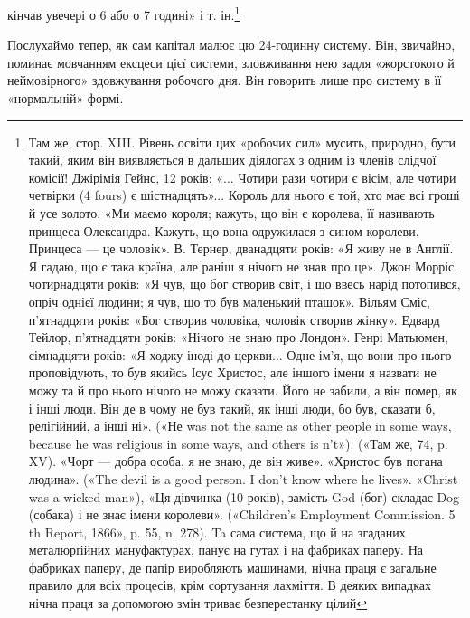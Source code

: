 кінчав увечері о 6 або о 7 годині» і т. ін.\footnote{
Там же, стор. XIII. Рівень освіти цих «робочих сил» мусить, природно,
бути такий, яким він виявляється в дальших діялогах з одним із
членів слідчої комісії! Джірімія Гейнс, 12 років: «... Чотири рази чотири
є вісім, але чотири четвірки (4 fours) є шістнадцять»... Король для
нього є той, хто має всі гроші й усе золото. «Ми маємо короля; кажуть,
що він є королева, її називають принцеса Олександра. Кажуть, що вона
одружилася з сином королеви. Принцеса — це чоловік». В. Тернер,
дванадцяти років: «Я живу не в Англії. Я гадаю, що є така країна, але
раніш я нічого не знав про це». Джон Морріс, чотирнадцяти років: «Я чув,
що бог створив світ, і що ввесь нарід потопився, опріч однієї людини; я
чув, що то був маленький пташок». Вільям Сміс, п’ятнадцяти років:
«Бог створив чоловіка, чоловік створив жінку». Едвард Тейлор, п’ятнадцяти
років: «Нічого не знаю про Лондон». Генрі Матьюмен, сімнадцяти
років: «Я ходжу іноді до церкви... Одне ім’я, що вони про нього проповідують,
то був якийсь Ісус Христос, але іншого імени я назвати не можу
та й про нього нічого не можу сказати. Його не забили, а він помер, як
і інші люди. Він де в чому не був такий, як інші люди, бо був, сказати б,
релігійний, а інші ні». («Не was not the same as other people in some ways,
because he was religious in some ways, and others is n’t»). («Там же, 74,
p. XV). «Чорт — добра особа, я не знаю, де він живе». «Христос був погана
людина». («The devil is a good person. I don’t know where he lives». «Christ
was a wicked man»), «Ця дівчинка (10 років), замість God (бог) складає
Dog (собака) і не знає імени королеви». («Children’s Employment Commission.
5 th Report, 1866», p. 55, n. 278). Ta сама система, що й на згаданих
металюрґійних мануфактурах, панує на гутах і на фабриках паперу.
На фабриках паперу, де папір виробляють машинами, нічна праця
є загальне правило для всіх процесів, крім сортування лахміття. В деяких
випадках нічна праця за допомогою змін триває безперестанку цілий
}

Послухаймо тепер, як сам капітал малює цю 24-годинну
систему. Він, звичайно, поминає мовчанням ексцеси цієї системи,
зловживання нею задля «жорстокого й неймовірного» здовжування
робочого дня. Він говорить лише про систему в її «нормальній»
формі.

